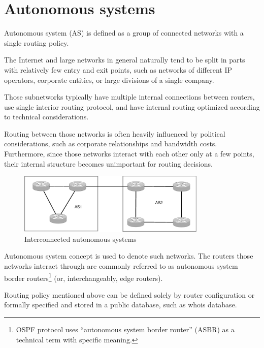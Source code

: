 %

\chapter{Autonomous systems}

Autonomous system (AS) is defined as a group of connected networks with a single routing policy\cite{rfc1930}.

The Internet and large networks in general naturally tend to be split in parts with relatively few
entry and exit points, such as networks of different IP operators, corporate entities, or large divisions
of a single company.

Those subnetworks typically have multiple internal connections between routers, use single interior
routing protocol, and have internal routing optimized according to technical considerations.

Routing between those networks is often heavily influenced by political considerations, such as
corporate relationships and bandwidth costs. Furthermore, since those networks interact with each other
only at a few points, their internal structure becomes unimportant for routing decisions.

\begin{figure}[h]
    \centering
    \includegraphics[width=0.8\textwidth]{graphics/as_example.eps}
    \caption{Interconnected autonomous systems}
    \label{fig:as_example}
\end{figure}

Autonomous system concept is used to denote such networks. The routers those networks interact
through are commonly referred to as autonomous system border routers\footnote{OSPF protocol uses
``autonomous system border router'' (ASBR) as a technical term with specific meaning.} (or, interchangeably, edge routers).

Routing policy mentioned above can be defined solely by router configuration or formally specified and stored in 
a public database, such as whois database.

